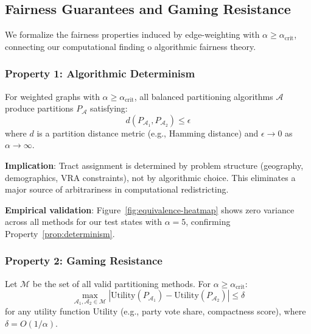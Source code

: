 \subsection{Fairness Guarantees and Gaming Resistance}
\label{sec:fairness-guarantees}

We formalize the fairness properties induced by edge-weighting with $\alpha \geq \alpha_{\text{crit}}$, connecting our computational finding 	o algorithmic fairness theory.

\subsubsection{Property 1: Algorithmic Determinism}

\begin{property}
\label{prop:determinism}
For weighted graphs with $\alpha \geq \alpha_{\text{crit}}$, all balanced partitioning algorithms $\mathcal{A}$ produce partitions $P_{\mathcal{A}}$ satisfying:
\[
d(P_{\mathcal{A}_1}, P_{\mathcal{A}_2}) \leq \epsilon
\]
where $d$ is a partition distance metric (e.g., Hamming distance) and $\epsilon \to 0$ as $\alpha \to \infty$.
\end{property}

\textbf{Implication}: Tract assignment is determined by problem structure (geography, demographics, VRA constraints), not by algorithmic choice. This eliminates a major source of arbitrariness in computational redistricting.

\textbf{Empirical validation}: Figure~\ref{fig:equivalence-heatmap} shows zero variance across all methods for our test states with $\alpha = 5$, confirming Property~\ref{prop:determinism}.

\subsubsection{Property 2: Gaming Resistance}

\begin{property}
\label{prop:gaming}
Let $\mathcal{M}$ be the set of all valid partitioning methods. For $\alpha \geq \alpha_{\text{crit}}$:
\[
\max_{\mathcal{A}_1, \mathcal{A}_2 \in \mathcal{M}} \left| \text{Utility}(P_{\mathcal{A}_1}) - \text{Utility}(P_{\mathcal{A}_2}) \right| \leq \delta
\]
for any utility function $\text{Utility}$ (e.g., party vote share, compactness score), where $\delta = O(1/\alpha)$.
\end{property}

